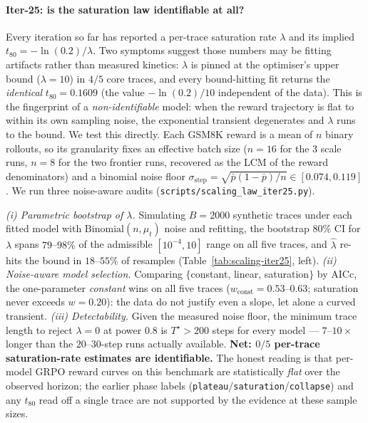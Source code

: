 \documentclass{article}
\begin{document}
\paragraph{Iter-25: is the saturation law identifiable at all?}
\label{par:scaling-iter25}
Every iteration so far has reported a per-trace saturation rate
$\lambda$ and its implied $t_{80}=-\ln(0.2)/\lambda$. Two symptoms
suggest those numbers may be fitting artifacts rather than measured
kinetics: $\lambda$ is pinned at the optimiser's upper bound
($\lambda\!=\!10$) in $4/5$ core traces, and every bound-hitting fit
returns the \emph{identical} $t_{80}=0.1609$ (the value $-\ln(0.2)/10$
independent of the data). This is the fingerprint of a
\emph{non-identifiable} model: when the reward trajectory is flat to
within its own sampling noise, the exponential transient degenerates
and $\lambda$ runs to the bound. We test this directly. Each GSM8K
reward is a mean of $n$ binary rollouts, so its granularity fixes an
effective batch size ($n=16$ for the 3 scale runs, $n=8$ for the two
frontier runs, recovered as the LCM of the reward denominators) and a
binomial noise floor $\sigma_{\text{step}}=\sqrt{\bar p(1-\bar p)/n}\in
[0.074,0.119]$. We run three noise-aware audits
(\texttt{scripts/scaling\_law\_iter25.py}).

\emph{(i) Parametric bootstrap of $\lambda$.} Simulating $B=2000$
synthetic traces under each fitted model with $\mathrm{Binomial}(n,\mu_t)$
noise and refitting, the bootstrap $80\%$ CI for $\lambda$ spans
$79$--$98\%$ of the admissible $[10^{-4},10]$ range on all five traces,
and $\hat\lambda$ re-hits the bound in $18$--$55\%$ of resamples
(Table~\ref{tab:scaling-iter25}, left). \emph{(ii) Noise-aware model
selection.} Comparing $\{$constant, linear, saturation$\}$ by AICc, the
one-parameter \emph{constant} wins on all five traces
($w_{\text{const}}=0.53$--$0.63$; saturation never exceeds $w=0.20$):
the data do not justify even a slope, let alone a curved transient.
\emph{(iii) Detectability.} Given the measured noise floor, the minimum
trace length to reject $\lambda=0$ at power $0.8$ is
$T^\star>200$ steps for every model --- $7$--$10\times$ longer than the
$20$--$30$-step runs actually available. \textbf{Net: $0/5$ per-trace
saturation-rate estimates are identifiable.} The honest reading is that
per-model GRPO reward curves on this benchmark are statistically
\emph{flat} over the observed horizon; the earlier phase labels
(\texttt{plateau}/\texttt{saturation}/\texttt{collapse}) and any
$t_{80}$ read off a single trace are not supported by the evidence at
these sample sizes.
\end{document}
